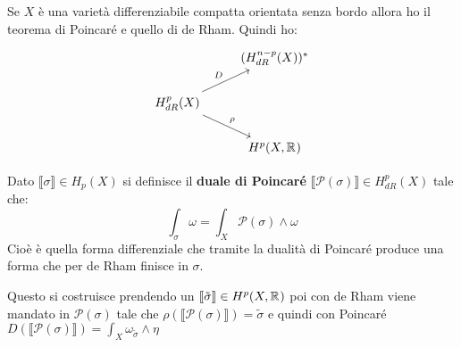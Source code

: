 Se $ X $ è una varietà differenziabile compatta orientata senza bordo
allora ho il teorema di Poincaré e quello di de Rham. Quindi ho:
\[
  \begin{tikzcd}
    {} & (H^{n-p}_{dR}(X))^* \\
    H^p_{dR}(X) \arrow{ur}{D} \arrow{dr}{\rho} & {} \\
    {} & H^p(X, \RN{})
  \end{tikzcd}
\]
\begin{definition}
  Dato $ \llbracket \sigma \rrbracket \in H_p(X) $ si definisce il \textbf{duale di Poincaré}
  $ \llbracket\mathcal{P}(\sigma)\rrbracket \in H^p_{dR}(X) $ tale che:
  \[
    \int_\sigma \omega = \int_X \mathcal{P}(\sigma) \wedge \omega
  \]
  Cioè è quella forma differenziale che tramite la dualità di Poincaré
  produce una forma che per de Rham finisce in $ \sigma $.
\end{definition}
Questo si costruisce prendendo un $ \llbracket \tilde{\sigma} \rrbracket \in H^p(X, \mathbb{R}^{}) $ poi
con de Rham viene mandato in $  \mathcal{P}(\sigma)  $ tale che $ \rho(\llbracket\mathcal{P}(\sigma) \rrbracket) = \tilde{\sigma} $
e quindi con Poincaré $ D(\llbracket\mathcal{P}(\sigma) \rrbracket) = \int_X \omega_{\tilde{\sigma}} \wedge \eta $


